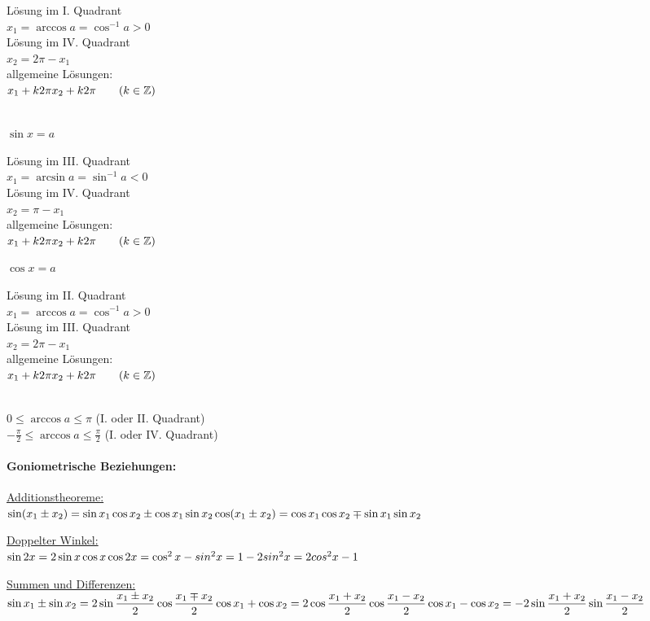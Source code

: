 Lösung im I. Quadrant\\
$x_1 = \arccos a = \cos^{-1}a>0$\\
Lösung im IV. Quadrant\\
$x_2 = 2\pi - x_1$\\
allgemeine Lösungen:\\
$x_1+k2\pi\\
x_2+k2\pi \qquad (k\in\mathbb{Z})$

\\
$\sin x = a$

Lösung im III. Quadrant\\
$x_1 = \arcsin a = \sin^{-1}a<0$\\
Lösung im IV. Quadrant\\
$x_2 = \pi - x_1$\\
allgemeine Lösungen:\\
$x_1+k2\pi\\
x_2+k2\pi \qquad (k\in\mathbb{Z})$

$\cos x = a$

Lösung im II. Quadrant\\
$x_1 = \arccos a = \cos^{-1}a>0$\\
Lösung im III. Quadrant\\
$x_2 = 2\pi - x_1$\\
allgemeine Lösungen:\\
$x_1+k2\pi\\
x_2+k2\pi \qquad (k\in\mathbb{Z})$

\Beachte \quad\\
$0\le\arccos a\le\pi$ (I. oder II. Quadrant)\\
$-\frac{\pi}{2}\le\arccos a\le\frac{\pi}{2}$ (I. oder IV. Quadrant)

\paragraph{Goniometrische Beziehungen:}\quad

\ul{Additionstheoreme:}\\
$\sin(x_1\pm x_2) = \sin x_1\cos x_2 \pm \cos x_1\sin x_2\\
\cos(x_1\pm x_2) = \cos x_1\cos x_2 \mp \sin x_1\sin x_2$

\ul{Doppelter Winkel:}\\
$\sin2x = 2\sin x\cos x\\
\cos2x = \cos^2 x-sin^2x = 1-2sin^2x = 2cos^2x-1$

\ul{Summen und Differenzen:}\\
$\sin x_1 \pm \sin x_2 = 2\sin\dfrac{x_1\pm x_2}{2}\cos\dfrac{x_1\mp x_2}{2}\\
\cos x_1 + \cos x_2 = 2\cos\dfrac{x_1+x_2}{2}\cos\dfrac{x_1-x_2}{2}\\
\cos x_1 - \cos x_2 = -2\sin\dfrac{x_1+x_2}{2}\sin\dfrac{x_1-x_2}{2}$

